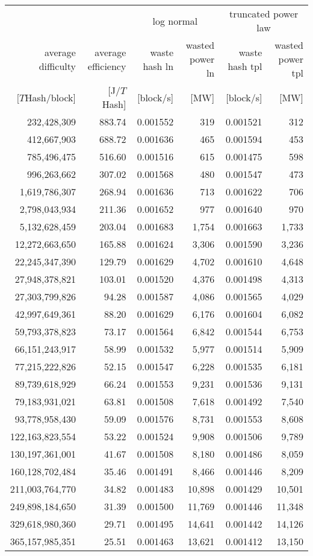 \begin{tabular}{@{}rrrrrr@{}}
\toprule
 &  & \multicolumn{2}{c}{log normal} & \multicolumn{2}{c}{truncated power law}\\
\cmidrule(lr){3-4} \cmidrule(lr){5-6} 
average difficulty & average efficiency & waste hash ln & wasted power ln & waste hash tpl & wasted power tpl\\
$[T$Hash/block] & [J/$T$Hash] & [block/s] & [MW] & [block/s] & [MW]\\
\cmidrule(lr){1-6}
232,428,309 & 883.74 & 0.001552 & 319 & 0.001521 & 312 \\
412,667,903 & 688.72 & 0.001636 & 465 & 0.001594 & 453 \\
785,496,475 & 516.60 & 0.001516 & 615 & 0.001475 & 598 \\
996,263,662 & 307.02 & 0.001568 & 480 & 0.001547 & 473 \\
1,619,786,307 & 268.94 & 0.001636 & 713 & 0.001622 & 706 \\
2,798,043,934 & 211.36 & 0.001652 & 977 & 0.001640 & 970 \\
5,132,628,459 & 203.04 & 0.001683 & 1,754 & 0.001663 & 1,733 \\
12,272,663,650 & 165.88 & 0.001624 & 3,306 & 0.001590 & 3,236 \\
22,245,347,390 & 129.79 & 0.001629 & 4,702 & 0.001610 & 4,648 \\
27,948,378,821 & 103.01 & 0.001520 & 4,376 & 0.001498 & 4,313 \\
27,303,799,826 & 94.28 & 0.001587 & 4,086 & 0.001565 & 4,029 \\
42,997,649,361 & 88.20 & 0.001629 & 6,176 & 0.001604 & 6,082 \\
59,793,378,823 & 73.17 & 0.001564 & 6,842 & 0.001544 & 6,753 \\
66,151,243,917 & 58.99 & 0.001532 & 5,977 & 0.001514 & 5,909 \\
77,215,222,826 & 52.15 & 0.001547 & 6,228 & 0.001535 & 6,181 \\
89,739,618,929 & 66.24 & 0.001553 & 9,231 & 0.001536 & 9,131 \\
79,183,931,021 & 63.81 & 0.001508 & 7,618 & 0.001492 & 7,540 \\
93,778,958,430 & 59.09 & 0.001576 & 8,731 & 0.001553 & 8,608 \\
122,163,823,554 & 53.22 & 0.001524 & 9,908 & 0.001506 & 9,789 \\
130,197,361,001 & 41.67 & 0.001508 & 8,180 & 0.001486 & 8,059 \\
160,128,702,484 & 35.46 & 0.001491 & 8,466 & 0.001446 & 8,209 \\
211,003,764,770 & 34.82 & 0.001483 & 10,898 & 0.001429 & 10,501 \\
249,898,184,650 & 31.39 & 0.001500 & 11,769 & 0.001446 & 11,348 \\
329,618,980,360 & 29.71 & 0.001495 & 14,641 & 0.001442 & 14,126 \\
365,157,985,351 & 25.51 & 0.001463 & 13,621 & 0.001412 & 13,150 \\
\bottomrule
\end{tabular}
